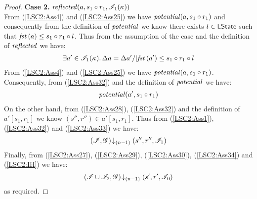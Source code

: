 \begin{lemma}
\begin{proof}
\noindent\textbf{Case 2. }
$\mathit{reflected}(a, s_1 \circ r_1, \mathscr{I}_1(\kappa_{}))$\\
From (\ref{LSC2:Ass4}) and (\ref{LSC2:Ass25}) we have $\mathit{potential}(a, s_1 \circ r_1)$ and consequently from the definition of $\mathit{potential}$ we know there exists $l \in \textsf{LState}$ such that $\mathit{fst}\left(a\right) \leq s_1 \circ r_1 \circ l$. Thus from the assumption of the case and the definition of $\mathit{reflected}$ we have:
%
\begin{align}
	\exists a' \in \mathscr{I}_1(\kappa_{}) .\, \Delta {a} = \Delta {a'} /| \mathit{fst}\left(a'\right) \leq s_1 \circ r_1 \circ l
	\label{LSC2:Ass32}
\end{align}
%
From (\ref{LSC2:Ass4}) and (\ref{LSC2:Ass25}) we have $\mathit{potential}(a, s_1 \circ r_1)$. Consequently, from (\ref{LSC2:Ass32}) and the definition of $\mathit{potential}$ we have:
%
\begin{align}
	\mathit{potential}(a', s_1 \circ r_1)
	\label{LSC2:Ass33}
\end{align}
%
On the other hand, from (\ref{LSC2:Ass28}), (\ref{LSC2:Ass32}) and the definition of $a'[s_1, r_1]$ we know $(s'', r'') \in a'[s_1, r_1]$. Thus from (\ref{LSC2:Ass1}), (\ref{LSC2:Ass32}) and (\ref{LSC2:Ass33}) we have:
%
\begin{align}
	\left(\mathscr{I}, \mathscr{G}\right) \!\downarrow_{(n-1)} \left(s'', r'', \mathscr{I}_1\right)
	\label{LSC2:Ass34}
\end{align}
%
Finally, from (\ref{LSC2:Ass27}), (\ref{LSC2:Ass29}), (\ref{LSC2:Ass30}), (\ref{LSC2:Ass34}) and (\ref{LSC2:IH}) we have: 
%
\begin{align*}
	\left(\mathscr{I} \cup \mathscr{I}_2, \mathscr{G}\right) \!\downarrow_{(n-1)} \left(s', r', \mathscr{I}_0\right)
\end{align*}
%
as required.
%
\end{proof}
%
\end{lemma}
%
%
%
